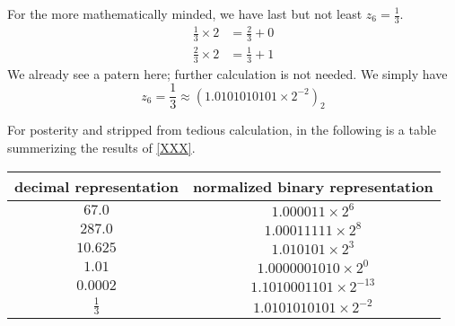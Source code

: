 \begin{exmp}
    For the more mathematically minded, we have last but not least \(z_6 = \frac{1}{3}\).
    \begin{align*}
        \frac{1}{3} \times 2 &= \frac{2}{3} + 0 \\
        \frac{2}{3} \times 2 &= \frac{1}{3} + 1
    \end{align*}
    We already see a patern here; further calculation is not needed. We simply have
    \begin{equation*}
        z_6 = \frac{1}{3} \approx (1.0101010101 \times 2^{-2})_2
    \end{equation*}
\end{exmp}
%
For posterity and stripped from tedious calculation, in the following is a table summerizing the results of \ref{XXX}.
\begin{center}
    \begin{tabular}{| c | c |}
        \hline
        decimal representation & normalized binary representation\\
        \hline
        \(67.0\) & \(1.000011 \times 2^6\) \\
        \(287.0\) & \(1.00011111 \times 2^8\) \\
        \(10.625\) & \(1.010101 \times 2^3\) \\
        \(1.01\) & \(1.0000001010 \times 2^0\) \\
        \(0.0002\) & \(1.1010001101 \times 2^{-13}\) \\
        \(\frac{1}{3}\) & \(1.0101010101 \times 2^{-2}\) \\
        \hline
    \end{tabular}
\end{center}